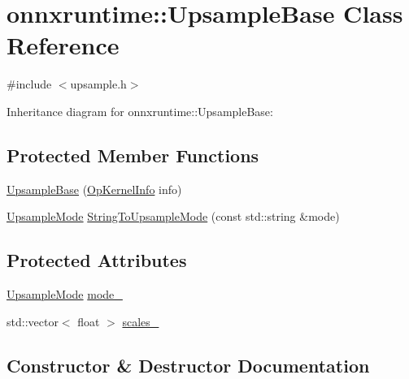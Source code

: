 \hypertarget{classonnxruntime_1_1UpsampleBase}{}\section{onnxruntime\+:\+:Upsample\+Base Class Reference}
\label{classonnxruntime_1_1UpsampleBase}


{\ttfamily \#include $<$upsample.\+h$>$}



Inheritance diagram for onnxruntime\+:\+:Upsample\+Base\+:
\subsection*{Protected Member Functions}
\begin{DoxyCompactItemize}
\item 
\mbox{\hyperlink{classonnxruntime_1_1UpsampleBase_a94c3d7385b1ebb0e9b32206b614df9ee}{Upsample\+Base}} (\mbox{\hyperlink{classonnxruntime_1_1OpKernelInfo}{Op\+Kernel\+Info}} info)
\item 
\mbox{\hyperlink{namespaceonnxruntime_ac1731b73e10b6a91015c32c7e29d03bd}{Upsample\+Mode}} \mbox{\hyperlink{classonnxruntime_1_1UpsampleBase_a75a5c95280ba6b81fbde77febba4f526}{String\+To\+Upsample\+Mode}} (const std\+::string \&mode)
\end{DoxyCompactItemize}
\subsection*{Protected Attributes}
\begin{DoxyCompactItemize}
\item 
\mbox{\hyperlink{namespaceonnxruntime_ac1731b73e10b6a91015c32c7e29d03bd}{Upsample\+Mode}} \mbox{\hyperlink{classonnxruntime_1_1UpsampleBase_a82cf1a1cc2cc235e48febda998449102}{mode\+\_\+}}
\item 
std\+::vector$<$ float $>$ \mbox{\hyperlink{classonnxruntime_1_1UpsampleBase_a3be327fb9739ba0afd7881ac87b91d1f}{scales\+\_\+}}
\end{DoxyCompactItemize}


\subsection{Constructor \& Destructor Documentation}
\mbox{\label{classonnxruntime_1_1UpsampleBase_a94c3d7385b1ebb0e9b32206b614df9ee}} 
